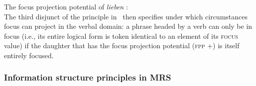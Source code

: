 \documentclass[output=paper,biblatex,babelshorthands,newtxmath,draftmode,colorlinks,citecolor=brown]{langscibook}
\begin{document}
\ea
The focus projection potential of \textit{lieben} \citep[105]{dKM2003a}:\\
\label{ex:fpp-lieben}
\z
The third disjunct of the principle in~ then specifies under which circumstances
focus can project in the verbal domain: a phrase headed by a verb can
only be in focus (i.e., its entire logical form is token identical
to an element of its \textsc{focus} value) if the daughter that has the focus
projection potential (\textsc{fpp} $+$) is itself entirely focused.


\subsubsection{Information structure principles in MRS}
\end{document}
